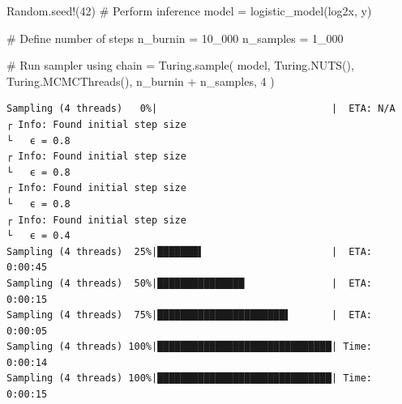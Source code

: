 \documentclass[
]{scrartcl}
\newenvironment{Shaded}{\begin{snugshade}}{\end{snugshade}}
\newcommand{\BuiltInTok}[1]{\textcolor[rgb]{0.00,0.23,0.31}{#1}}
\newcommand{\CommentTok}[1]{\textcolor[rgb]{0.37,0.37,0.37}{#1}}
\newcommand{\FloatTok}[1]{\textcolor[rgb]{0.68,0.00,0.00}{#1}}
\newcommand{\FunctionTok}[1]{\textcolor[rgb]{0.28,0.35,0.67}{#1}}
\newcommand{\NormalTok}[1]{\textcolor[rgb]{0.00,0.23,0.31}{#1}}
\newcommand{\OperatorTok}[1]{\textcolor[rgb]{0.37,0.37,0.37}{#1}}
\begin{document}
\begin{Shaded}
\begin{Highlighting}[]
\BuiltInTok{Random}\NormalTok{.}\FunctionTok{seed!}\NormalTok{(}\FloatTok{42}\NormalTok{)}
\CommentTok{\# Perform inference}
\NormalTok{model }\OperatorTok{=} \FunctionTok{logistic\_model}\NormalTok{(log2x, y)}

\CommentTok{\# Define number of steps}
\NormalTok{n\_burnin }\OperatorTok{=} \FloatTok{10\_000}
\NormalTok{n\_samples }\OperatorTok{=} \FloatTok{1\_000}

\CommentTok{\# Run sampler using}
\NormalTok{chain }\OperatorTok{=}\NormalTok{ Turing.}\FunctionTok{sample}\NormalTok{(}
\NormalTok{    model, Turing.}\FunctionTok{NUTS}\NormalTok{(), Turing.}\FunctionTok{MCMCThreads}\NormalTok{(), n\_burnin }\OperatorTok{+}\NormalTok{ n\_samples, }\FloatTok{4}
\NormalTok{)}
\end{Highlighting}
\end{Shaded}

\begin{verbatim}
Sampling (4 threads)   0%|                              |  ETA: N/A
┌ Info: Found initial step size
└   ϵ = 0.8
┌ Info: Found initial step size
└   ϵ = 0.8
┌ Info: Found initial step size
└   ϵ = 0.8
┌ Info: Found initial step size
└   ϵ = 0.4
Sampling (4 threads)  25%|███████▌                      |  ETA: 0:00:45
Sampling (4 threads)  50%|███████████████               |  ETA: 0:00:15
Sampling (4 threads)  75%|██████████████████████▌       |  ETA: 0:00:05
Sampling (4 threads) 100%|██████████████████████████████| Time: 0:00:14
Sampling (4 threads) 100%|██████████████████████████████| Time: 0:00:15
\end{verbatim}
\end{document}
